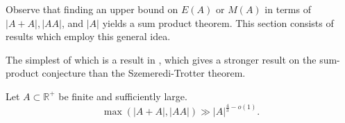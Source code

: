 \documentclass[12pt]{amsart}
\begin{document}
Observe that finding an upper bound on \(E(A)\) or \(M(A)\) in terms of \(\left\lvert A + A \right\rvert, \left\lvert AA \right\rvert    \), and \(\left\lvert A \right\rvert \)
yields a sum product theorem. This section consists of results which employ this general idea.

The simplest of which is a result in \cite{Solymosi}, which gives a stronger result
on the sum-product conjecture than the Szemeredi-Trotter theorem. 

\begin{theorem}
Let \(A \subset \mathbb{R}^{+} \) be finite and sufficiently large.
\[
    \max \left( \left\lvert A+A \right\rvert , \left\lvert AA \right\rvert  \right) \gg \left\lvert A \right\rvert ^{\frac{4}{3} - o(1)}
.\]
\end{theorem}
\end{document}
